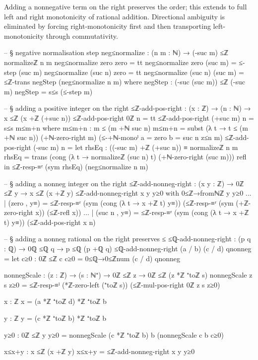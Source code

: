 \documentclass[11pt,a4paper]{book}
\begin{document}
Adding a nonnegative term on the right preserves the order; this extends
to full left and right monotonicity of rational addition. Directional ambiguity
is eliminated by forcing right-monotonicity first and then
transporting left-monotonicity through commutativity.

\begin{code}
-- § negative normalisation step
neg≤normalize : (n m : ℕ) → (-suc m) ≤ℤ normalizeℤ n m
neg≤normalize zero zero = tt
neg≤normalize zero (suc m) = ≤-step (suc m)
neg≤normalize (suc n) zero = tt
neg≤normalize (suc n) (suc m) =
  ≤ℤ-trans negStep (neg≤normalize n m)
  where
    negStep : (-suc (suc m)) ≤ℤ (-suc m)
    negStep = s≤s (≤-step m)

-- § adding a positive integer on the right
≤ℤ-add-pos-right : (x : ℤ) → (n : ℕ) → x ≤ℤ (x +ℤ (+suc n))
≤ℤ-add-pos-right 0ℤ n = tt
≤ℤ-add-pos-right (+suc m) n = s≤s m≤m+n
  where
    m≤m+n : m ≤ (m +ℕ suc n)
    m≤m+n =
      subst (λ t → t ≤ (m +ℕ suc n))
        (+ℕ-zero-right m)
        (≤-+ℕ-monoˡ {a = zero} {b = suc n} z≤n m)
≤ℤ-add-pos-right (-suc m) n =
  let
    rhsEq : ((-suc m) +ℤ (+suc n)) ≡ normalizeℤ n m
    rhsEq =
      trans
        (cong (λ t → normalizeℤ (suc n) t) (+ℕ-zero-right (suc m)))
        refl
  in
  ≤ℤ-resp-≡ʳ (sym rhsEq) (neg≤normalize n m)

-- § adding a nonneg integer on the right
≤ℤ-add-nonneg-right : (x y : ℤ) → 0ℤ ≤ℤ y → x ≤ℤ (x +ℤ y)
≤ℤ-add-nonneg-right x y y≥0 with 0≤ℤ→fromℕℤ y y≥0
... | (zero , y≡) =
  ≤ℤ-resp-≡ʳ (sym (cong (λ t → x +ℤ t) y≡)) (≤ℤ-resp-≡ʳ (sym (+ℤ-zero-right x)) (≤ℤ-refl x))
... | (suc n , y≡) =
  ≤ℤ-resp-≡ʳ (sym (cong (λ t → x +ℤ t) y≡)) (≤ℤ-add-pos-right x n)

-- § adding a nonneg rational on the right preserves ≤
≤ℚ-add-nonneg-right : (p q : ℚ) → 0ℚ ≤ℚ q → p ≤ℚ (p +ℚ q)
≤ℚ-add-nonneg-right (a / b) (c / d) qnonneg =
  let
    c≥0 : 0ℤ ≤ℤ c
    c≥0 = 0≤ℚ→0≤ℤnum (c / d) qnonneg

    nonnegScale : (z : ℤ) → (s : ℕ⁺) → 0ℤ ≤ℤ z → 0ℤ ≤ℤ (z *ℤ ⁺toℤ s)
    nonnegScale z s z≥0 =
      ≤ℤ-resp-≡ˡ (*ℤ-zero-left (⁺toℤ s))
        (≤ℤ-mul-pos-right 0ℤ z s z≥0)

    x : ℤ
    x = (a *ℤ ⁺toℤ d) *ℤ ⁺toℤ b

    y : ℤ
    y = (c *ℤ ⁺toℤ b) *ℤ ⁺toℤ b

    y≥0 : 0ℤ ≤ℤ y
    y≥0 = nonnegScale (c *ℤ ⁺toℤ b) b (nonnegScale c b c≥0)

    x≤x+y : x ≤ℤ (x +ℤ y)
    x≤x+y = ≤ℤ-add-nonneg-right x y y≥0


\end{code}
\end{document}
